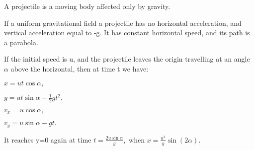  A projectile is a moving body affected only by gravity.
\par
If a uniform gravitational field a projectile has no 
horizontal acceleration, and vertical acceleration equal
to -g. It has constant horizontal speed, and its path is 
a parabola.
\par
If the initial speed is u, and the projectile leaves the origin
travelling at an angle $ \alpha $ above the horizontal, then at time
t we have:
\par
$ x = ut \cos \alpha , $
\par
$ y = ut \sin \alpha  - \frac{1}{2} g t^2 , $
\par
$ v_x = u \cos \alpha , $
\par
$ v_y = u \sin \alpha - gt . $
\par
It reaches y=0 again at time $ t = \frac{2u \sin \alpha }{g} , $ 
when $ x = \frac{u^2}{g} \sin ( 2 \alpha ) . $
